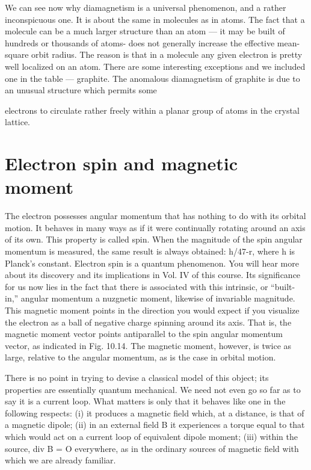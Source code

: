 
We can see now why diamagnetism is a universal phenomenon,
and a rather inconspicuous one. It is about the same in molecules
as in atoms. The fact that a molecule can be a much larger structure
than an atom --- it may be built of hundreds or thousands of atoms-
does not generally increase the effective mean-square orbit radius.
The reason is that in a molecule any given electron is pretty well
localized on an atom. There are some interesting exceptions and
we included one in the table --- graphite. The anomalous 
diamagnetism of graphite is due to an unusual structure which permits some

electrons to circulate rather freely within a planar group of atoms
in the crystal lattice.

\iffalse

\section{Electron spin and magnetic moment}

The electron possesses angular momentum that has nothing to
do with its orbital motion. It behaves in many ways as if it were
continually rotating around an axis of its own. This property is
called spin. When the magnitude of the spin angular momentum
is measured, the same result is always obtained: h/47-r, where h is
Planck's constant. Electron spin is a quantum phenomenon. You
will hear more about its discovery and its implications in Vol. IV of
this course. Its significance for us now lies in the fact that there is
associated with this intrinsic, or ``built-in,'' angular momentum a
nuzgnetic moment, likewise of invariable magnitude. This magnetic
moment points in the direction you would expect if you visualize
the electron as a ball of negative charge spinning around its axis.
That is, the magnetic moment vector points antiparallel to the spin
angular momentum vector, as indicated in Fig. 10.14. The magnetic
moment, however, is twice as large, relative to the angular 
momentum, as is the case in orbital motion.

There is no point in trying to devise a classical model of this object;
its properties are essentially quantum mechanical. We need not
even go so far as to say it is a current loop. What matters is only that
it behaves like one in the following respects: (i) it produces a magnetic
field which, at a distance, is that of a magnetic dipole; (ii) in an
external field B it experiences a torque equal to that which would
act on a current loop of equivalent dipole moment; (iii) within the
source, div B = O everywhere, as in the ordinary sources of magnetic
field with which we are already familiar.

